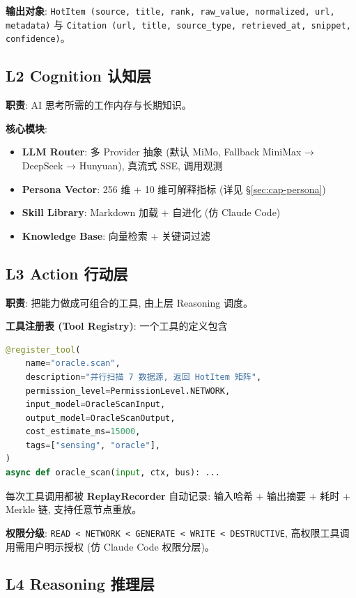 \textbf{输出对象}: \texttt{HotItem (source, title, rank, raw\_value, normalized, url, metadata)} 与 \texttt{Citation (url, title, source\_type, retrieved\_at, snippet, confidence)}。

\subsection{L2 Cognition 认知层}

\textbf{职责}: AI 思考所需的工作内存与长期知识。

\textbf{核心模块}:
\begin{itemize}
    \item \textbf{LLM Router}: 多 Provider 抽象 (默认 MiMo, Fallback MiniMax → DeepSeek → Hunyuan), 真流式 SSE, 调用观测
    \item \textbf{Persona Vector}: 256 维 + 10 维可解释指标 (详见 §\ref{sec:cap-persona})
    \item \textbf{Skill Library}: Markdown 加载 + 自进化 (仿 Claude Code)
    \item \textbf{Knowledge Base}: 向量检索 + 关键词过滤
\end{itemize}

\subsection{L3 Action 行动层}

\textbf{职责}: 把能力做成可组合的工具, 由上层 Reasoning 调度。

\textbf{工具注册表 (Tool Registry)}: 一个工具的定义包含

\begin{lstlisting}[language=Python, caption={Tool 注册示例}]
@register_tool(
    name="oracle.scan",
    description="并行扫描 7 数据源, 返回 HotItem 矩阵",
    permission_level=PermissionLevel.NETWORK,
    input_model=OracleScanInput,
    output_model=OracleScanOutput,
    cost_estimate_ms=15000,
    tags=["sensing", "oracle"],
)
async def oracle_scan(input, ctx, bus): ...
\end{lstlisting}

每次工具调用都被 \textbf{ReplayRecorder} 自动记录: 输入哈希 + 输出摘要 + 耗时 + Merkle 链, 支持任意节点重放。

\textbf{权限分级}: \texttt{READ < NETWORK < GENERATE < WRITE < DESTRUCTIVE}, 高权限工具调用需用户明示授权 (仿 Claude Code 权限分层)。

\subsection{L4 Reasoning 推理层}

